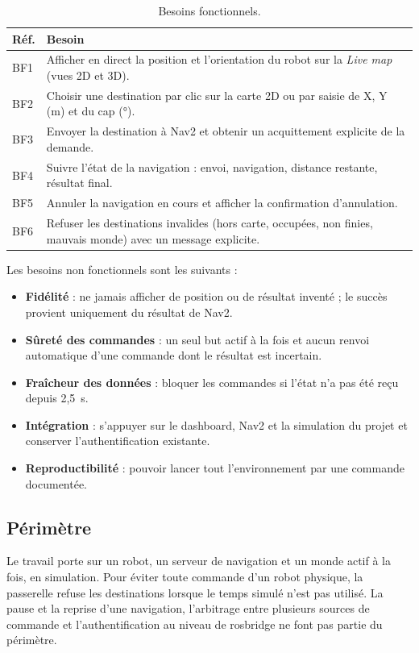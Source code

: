 \begin{table}[htbp]
\centering\small
\begin{tabularx}{\linewidth}{@{}lX@{}}
\toprule
\textbf{Réf.} & \textbf{Besoin} \\
\midrule
BF1 & Afficher en direct la position et l'orientation du robot sur la \emph{Live map} (vues 2D et 3D). \\
BF2 & Choisir une destination par clic sur la carte 2D ou par saisie de X, Y (m) et du cap (°). \\
BF3 & Envoyer la destination à Nav2 et obtenir un acquittement explicite de la demande. \\
BF4 & Suivre l'état de la navigation : envoi, navigation, distance restante, résultat final. \\
BF5 & Annuler la navigation en cours et afficher la confirmation d'annulation. \\
BF6 & Refuser les destinations invalides (hors carte, occupées, non finies, mauvais monde) avec un message explicite. \\
\bottomrule
\end{tabularx}
\caption{Besoins fonctionnels.}
\label{tab:besoins}
\end{table}

Les besoins non fonctionnels sont les suivants :
\begin{itemize}
  \item \textbf{Fidélité} : ne jamais afficher de position ou de résultat inventé ; le
    succès provient uniquement du résultat de Nav2.
  \item \textbf{Sûreté des commandes} : un seul but actif à la fois et aucun renvoi
    automatique d'une commande dont le résultat est incertain.
  \item \textbf{Fraîcheur des données} : bloquer les commandes si l'état n'a pas été reçu
    depuis 2,5~s.
  \item \textbf{Intégration} : s'appuyer sur le dashboard, Nav2 et la simulation du projet
    et conserver l'authentification existante.
  \item \textbf{Reproductibilité} : pouvoir lancer tout l'environnement par une commande
    documentée.
\end{itemize}

\subsection{Périmètre}
Le travail porte sur un robot, un serveur de navigation et un monde actif à la fois, en
simulation. Pour éviter toute commande d'un robot physique, la passerelle refuse les
destinations lorsque le temps simulé n'est pas utilisé. La pause et la reprise d'une
navigation, l'arbitrage entre plusieurs sources de commande et l'authentification au
niveau de rosbridge ne font pas partie du périmètre.

